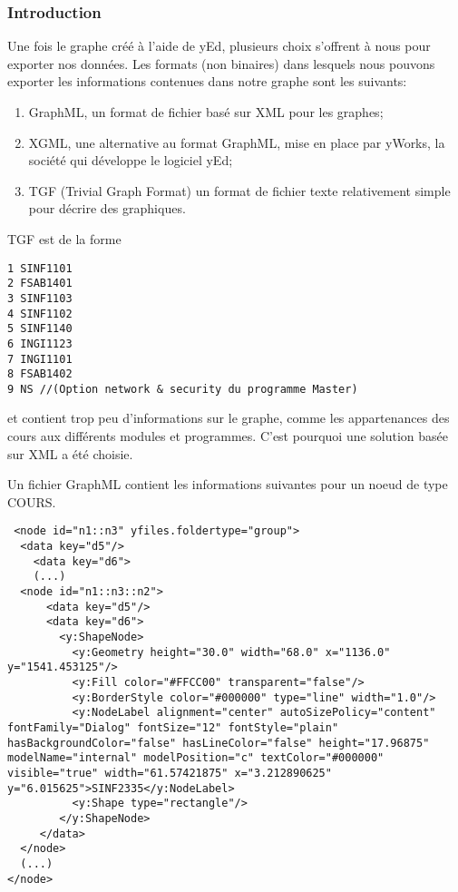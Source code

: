 \subsubsection{Introduction}
\label{graph_format_justification}
Une fois le graphe créé à l'aide de yEd, plusieurs choix s'offrent à nous pour exporter nos données. Les formats (non binaires) dans lesquels nous pouvons exporter les informations contenues dans notre graphe sont les suivants:
\begin{enumerate}
\item GraphML, un format de fichier basé sur XML pour les graphes;
\item XGML, une alternative au format GraphML, mise en place par yWorks, la société qui développe le logiciel yEd;
\item TGF (Trivial Graph Format) un format de fichier texte relativement simple pour décrire des graphiques.
\end{enumerate}

TGF est de la forme

\begin{lstlisting}
1 SINF1101
2 FSAB1401
3 SINF1103
4 SINF1102
5 SINF1140
6 INGI1123
7 INGI1101
8 FSAB1402
9 NS //(Option network & security du programme Master)
\end{lstlisting}

et contient trop peu d'informations sur le graphe, comme les appartenances des cours aux différents modules et programmes. C'est pourquoi une solution basée sur XML a été choisie.

Un fichier GraphML contient les informations suivantes pour un noeud de type COURS.

\begin{lstlisting}
 <node id="n1::n3" yfiles.foldertype="group">
  <data key="d5"/>
    <data key="d6">
    (...)
  <node id="n1::n3::n2">
      <data key="d5"/>
      <data key="d6">
        <y:ShapeNode>
          <y:Geometry height="30.0" width="68.0" x="1136.0" y="1541.453125"/>
          <y:Fill color="#FFCC00" transparent="false"/>
          <y:BorderStyle color="#000000" type="line" width="1.0"/>
          <y:NodeLabel alignment="center" autoSizePolicy="content" fontFamily="Dialog" fontSize="12" fontStyle="plain" hasBackgroundColor="false" hasLineColor="false" height="17.96875" modelName="internal" modelPosition="c" textColor="#000000" visible="true" width="61.57421875" x="3.212890625" y="6.015625">SINF2335</y:NodeLabel>
          <y:Shape type="rectangle"/>
        </y:ShapeNode>
     </data>
  </node>
  (...)
</node>
\end{lstlisting}

